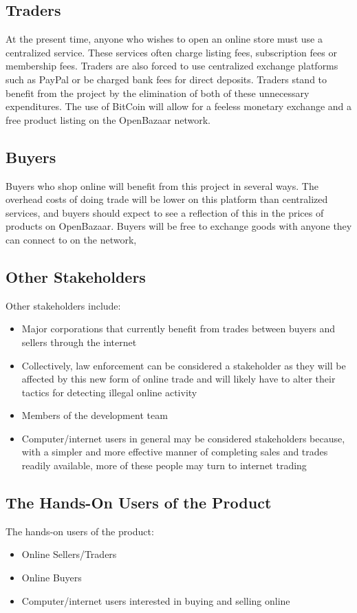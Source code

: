 \documentclass{article}
\begin{document}
\subsection{Traders}
At the present time, anyone who wishes to open an online store must use a centralized service. These services often charge listing fees, subscription fees or membership fees. Traders are also forced to use centralized exchange platforms such as PayPal or be charged bank fees for direct deposits. Traders stand to benefit from the project by the elimination of both of these unnecessary expenditures. The use of BitCoin will allow for a feeless monetary exchange and a free product listing on the OpenBazaar network.

\subsection{Buyers}
Buyers who shop online will benefit from this project in several ways. The overhead costs of doing trade will be lower on this platform than centralized services, and buyers should expect to see a reflection of this in the prices of products on OpenBazaar. Buyers will be free to exchange goods with anyone they can connect to on the network, 

\subsection{Other Stakeholders}
Other stakeholders include:

\begin{itemize}
\item
Major corporations that currently benefit from trades between buyers and sellers through the internet

\item
Collectively, law enforcement can be considered a stakeholder as they will be affected by this new form of online trade and will likely have to alter their tactics for detecting illegal online activity

\item
Members of the development team

\item
Computer/internet users in general may be considered stakeholders because, with a simpler and more effective manner of completing sales and trades readily available, more of these people may turn to internet trading
\end{itemize}


\subsection{The Hands-On Users of the Product}
The hands-on users of the product:
\begin{itemize}
\item
Online Sellers/Traders

\item
Online Buyers

\item
Computer/internet users interested in buying and selling online
\end{itemize}
\end{document}
